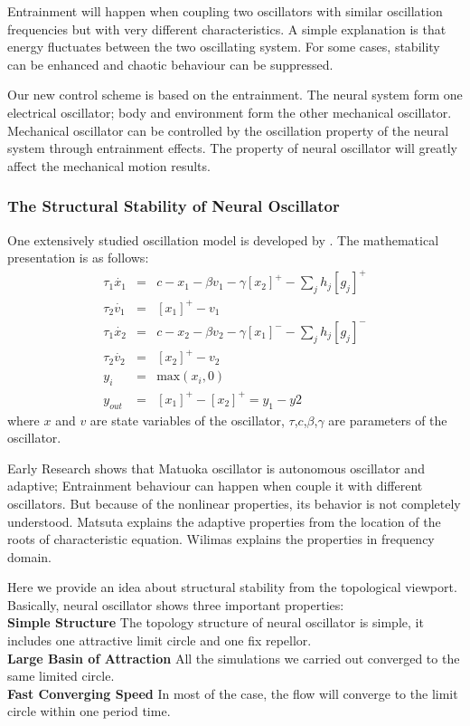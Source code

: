 Entrainment will happen when coupling two oscillators with similar oscillation frequencies but with very different characteristics. A simple explanation is that energy fluctuates between the two oscillating system. For some cases, stability can be enhanced and chaotic behaviour can be suppressed.

Our new control scheme is based on the entrainment. The neural system form one electrical oscillator; body and environment form the other mechanical oscillator. Mechanical oscillator can be controlled by the oscillation property of the neural system through entrainment effects. The property of neural oscillator will greatly affect the mechanical motion results.



\subsubsection{The Structural Stability of Neural Oscillator}
One extensively studied oscillation model is developed by \citet{neurooscillation}. 
The mathematical presentation is as follows:
\begin{eqnarray}
\tau_{1} \dot{x_{1}}&=&c-x_{1}-\beta v_{1}-\gamma [x_{2}]^{+}-\sum_{j}h_{j}[g_{j}]^{+}\\
\tau_{2} \dot{v_{1}}&=&[x_{1}]^{+}-v_{1}\\
\tau_{1} \dot{x_{2}}&=&c-x_{2}-\beta v_{2}-\gamma [x_{1}]^{-}-\sum_{j}h_{j}[g_{j}]^{-}\\
\tau_{2} \dot{v_{2}}&=&[x_{2}]^{+}-v_{2}\\
y_{i}&=&\mbox{max}(x_{i},0)\\
y_{out}&=&[x_{1}]^{+}-[x_{2}]^{+}=y_{1}-y{2}
\label{eq:matsuta}
\end{eqnarray}
where $x$ and $v$ are state variables of the oscillator, $\tau$,$c$,$\beta$,$\gamma$ are parameters of the oscillator.

Early Research shows that
Matuoka oscillator is autonomous oscillator and adaptive;
Entrainment behaviour can happen when couple it with different oscillators. 
But because of the nonlinear properties, its behavior is not completely understood. 
Matsuta\citep{Matsuoka1987} explains the adaptive properties from the location of the roots of  characteristic equation. 
Wilimas\citep{Williamson1998} explains the properties in frequency domain.

Here we provide an idea about structural stability from the topological viewport. Basically, neural oscillator shows three important properties:\\
\textbf{Simple Structure}
The topology structure of neural oscillator is simple, 
it includes one  attractive limit circle and one fix repellor.\\
\textbf{Large Basin of Attraction}
All the simulations we carried out converged to the same limited circle.\\
\textbf{Fast Converging Speed}
In most of the case, the flow will converge to the limit circle within one period time.\\

